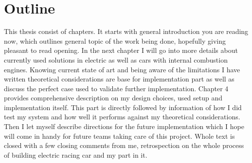 

\section{Outline}
This thesis consist of  chapters. It starts with general introduction you are reading now, which outlines general topic of the work being done, hopefully giving pleasant to read opening. 
In the next chapter I will go into more details about currently used solutions in electric as well as cars with internal combustion engines. Knowing current state of art and being aware of the limitations I have written theoretical considerations are base for implementation part as well as discuss the perfect case used to validate further implementation.
Chapter 4 provides comprehensive description on my design choices, used setup and implementation itself. This part is directly followed by information of how I did test my system and how well it performs against my theoretical considerations.
Then I let myself describe directions for the future implementation which I hope will come in handy for future teams taking care of this project.
Whole text is closed with a few closing comments from me, retrospection on the whole process of building electric racing car and my part in it.